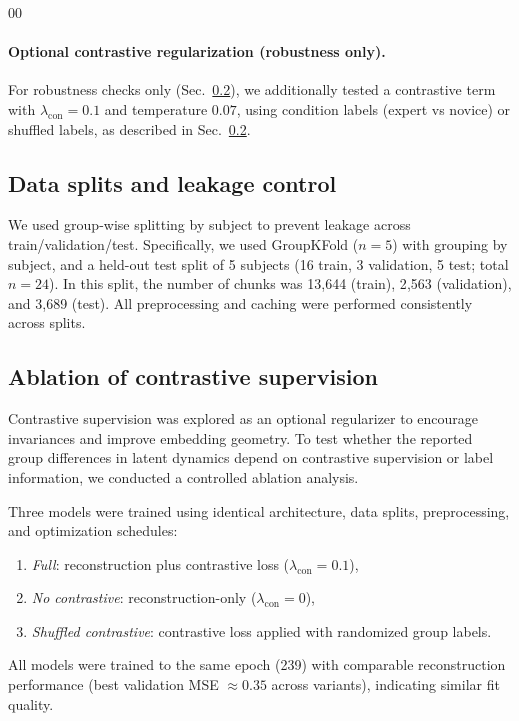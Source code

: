 \documentclass[5p,twocolumn,authoryear]{elsarticle}
\newcommand{\secref}[1]{Sec.~\ref{#1}}
\begin{document}
\begin{thebibliography}{00}
\paragraph{Optional contrastive regularization (robustness only).}
For robustness checks only (\secref{app:contrastive_ablation}), we additionally tested a contrastive term with $\lambda_{\mathrm{con}}=0.1$ and temperature $0.07$, using condition labels (expert vs novice) or shuffled labels, as described in \secref{app:contrastive_ablation}.

\subsection{Data splits and leakage control}
We used group-wise splitting by subject to prevent leakage across train/validation/test. Specifically, we used GroupKFold ($n=5$) with grouping by subject, and a held-out test split of 5 subjects (16 train, 3 validation, 5 test; total $n=24$). In this split, the number of chunks was 13{,}644 (train), 2{,}563 (validation), and 3{,}689 (test). All preprocessing and caching were performed consistently across splits.

\subsection{Ablation of contrastive supervision}
\label{app:contrastive_ablation}

Contrastive supervision was explored as an optional regularizer to encourage invariances and improve embedding geometry. To test whether the reported group differences in latent dynamics depend on contrastive supervision or label information, we conducted a controlled ablation analysis.

Three models were trained using identical architecture, data splits, preprocessing, and optimization schedules:
\begin{enumerate}
    \item \emph{Full}: reconstruction plus contrastive loss ($\lambda_{\mathrm{con}} = 0.1$),
    \item \emph{No contrastive}: reconstruction-only ($\lambda_{\mathrm{con}} = 0$),
    \item \emph{Shuffled contrastive}: contrastive loss applied with randomized group labels.
\end{enumerate}

All models were trained to the same epoch (239) with comparable reconstruction performance (best validation MSE $\approx 0.35$ across variants), indicating similar fit quality.


\end{thebibliography}
\end{document}
